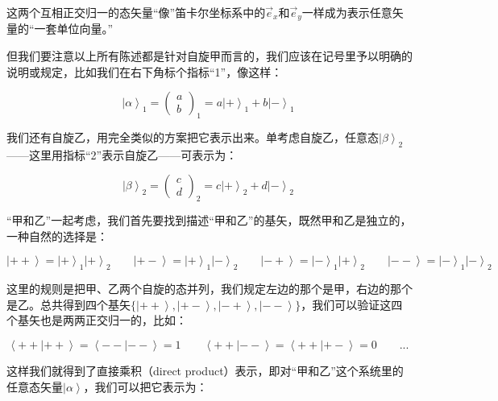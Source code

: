 这两个互相正交归一的态矢量“像”笛卡尔坐标系中的$\vec e_x$和$\vec e_y$一样成为表示任意矢量的“一套单位向量。”

但我们要注意以上所有陈述都是针对自旋甲而言的，我们应该在记号里予以明确的说明或规定，比如我们在右下角标个指标“1”，像这样：

\begin{equation}
\left| \alpha \right\rangle_1 = \left( \begin{array}{ccc} a \\ b \end{array} \right)_1 = a \left| + \right\rangle_1 + b \left| - \right\rangle_1~
\end{equation}

我们还有自旋乙，用完全类似的方案把它表示出来。单考虑自旋乙，任意态$\left| \beta \right\rangle_2$——这里用指标“2”表示自旋乙——可表示为：

\begin{equation}
\left| \beta \right\rangle_2 = \left( \begin{array}{ccc} c \\ d \end{array} \right)_2 = c \left| + \right\rangle_2 + d \left| - \right\rangle_2~
\end{equation}

“甲和乙”一起考虑，我们首先要找到描述“甲和乙”的基矢，既然甲和乙是独立的，一种自然的选择是：

\begin{equation}
\left| ++ \right\rangle  =  \left| + \right\rangle_1 \left| + \right\rangle_2\qquad
\left| +- \right\rangle  =  \left| + \right\rangle_1 \left| - \right\rangle_2\qquad
\left| -+ \right\rangle  =  \left| - \right\rangle_1 \left| + \right\rangle_2\qquad
\left| -- \right\rangle  =  \left| - \right\rangle_1 \left| - \right\rangle_2 ~
\end{equation}

这里的规则是把甲、乙两个自旋的态并列，我们规定左边的那个是甲，右边的那个是乙。总共得到四个基矢$\{ \left| ++ \right\rangle, \left| +- \right\rangle, \left| -+ \right\rangle, \left| - - \right\rangle \}$，我们可以验证这四个基矢也是两两正交归一的，比如：

\begin{equation}
\left\langle ++ | ++ \right\rangle = \left\langle -- | -- \right\rangle = 1 \qquad
\left\langle ++ | -- \right\rangle = \left\langle ++ | +- \right\rangle = 0 \qquad
{}  ...  {}~
\end{equation}

这样我们就得到了直接乘积（direct product）表示，即对“甲和乙”这个系统里的任意态矢量$\left| \alpha \right\rangle$，我们可以把它表示为：

